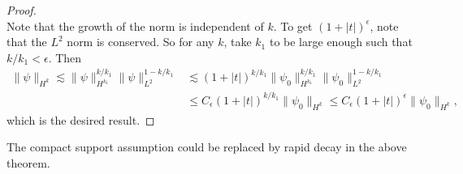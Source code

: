\begin{proof}
\[  \]
  Note that the growth of the norm is independent of
  $k$.
  To get $(1 + |t|)^\epsilon$, note that the
  $L^2$ norm is conserved. So for any $k$, take
  $k_1$ to be large enough such that $k / k_1 < \epsilon$.
  Then
  \begin{align*}
    \|\psi\|_{H^k}
    \lesssim \|\psi\|^{k / k_1}_{H^{k_1}} \|\psi\|_{L^2}^{1 - k / k_1}
    &\lesssim (1 + |t|)^{k / k_1} \|\psi_0\|_{H^{k_1}}^{k / k_1} \|\psi_0\|_{L^2}^{1 - k / k_1} \\
    &\le C_\epsilon (1 + |t|)^{k / k_1} \|\psi_0\|_{H^k}
    \le C_\epsilon (1 + |t|)^\epsilon \|\psi_0\|_{H^k},
  \end{align*}
  which is the desired result.
\end{proof}

\begin{remark}
  The compact support assumption could be replaced
  by rapid decay in the above theorem.
\end{remark}
